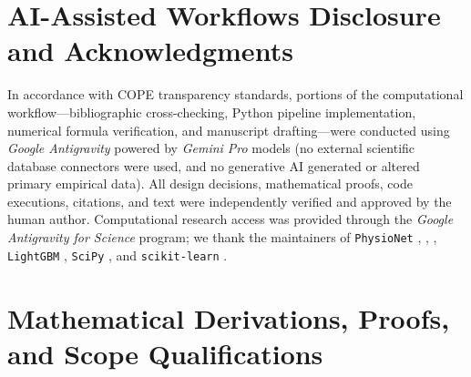 \documentclass[11pt]{article}
\begin{document}
\section*{AI-Assisted Workflows Disclosure and Acknowledgments}

In accordance with COPE transparency standards, portions of the computational workflow---bibliographic cross-checking, Python pipeline implementation, numerical formula verification, and manuscript drafting---were conducted using \emph{Google Antigravity} powered by \emph{Gemini Pro} models (no external scientific database connectors were used, and no generative AI generated or altered primary empirical data). All design decisions, mathematical proofs, code executions, citations, and text were independently verified and approved by the human author. Computational research access was provided through the \emph{Google Antigravity for Science} program; we thank the maintainers of \texttt{PhysioNet} \citep{goldberger2000physionet}, \citet{reyna2020early}, \citet{hong2018predicting}, \texttt{LightGBM} \citep{ke2017lightgbm}, \texttt{SciPy} \citep{virtanen2020scipy}, and \texttt{scikit-learn} \citep{pedregosa2011scikit}.

\appendix

\section{Mathematical Derivations, Proofs, and Scope Qualifications}
\label{app:proofs}
\end{document}
